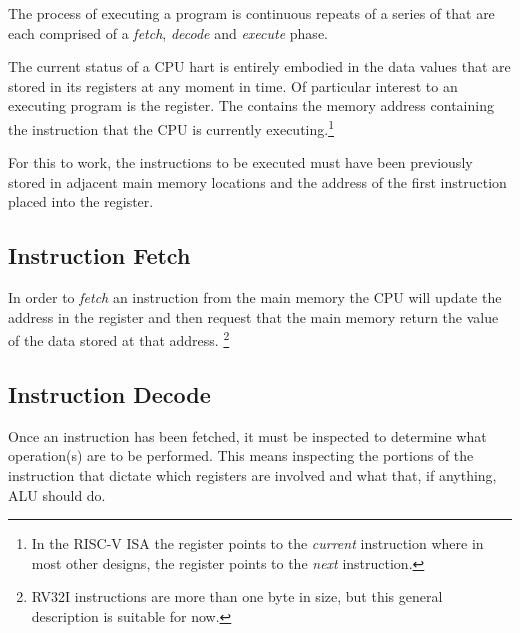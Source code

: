 The process of executing a program is continuous repeats of a series of
 that are each comprised
of a {\em fetch}, {\em decode} and {\em execute} phase.

The current status of a CPU hart is entirely embodied in the data values that
are stored in its registers at any moment in time.  Of particular interest
to an executing program is the  register.  The  contains
the memory address containing the instruction that the CPU is currently
executing.\footnote{In the RISC-V ISA the  register points to the
{\em current} instruction where in most other designs, the 
register points to the {\em next} instruction.}

For this to work, the instructions to be executed must have been previously
stored in adjacent main memory locations and the address of the first instruction
placed into the  register.


\subsection{Instruction Fetch}

In order to {\em fetch} an instruction from the main memory the CPU
will update the address in the  register and then request that
the main memory return the value of the data stored at that address.
\footnote{RV32I instructions are more than one byte in size, but
this general description is suitable for now.}





\subsection{Instruction Decode}

Once an instruction has been fetched, it must be inspected to determine what
operation(s) are to be performed.  This means inspecting the portions of the
instruction that dictate which registers are involved and what that, if
anything, ALU should do.

